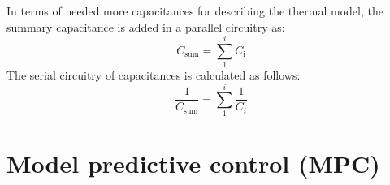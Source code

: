     In terms of needed more capacitances for describing the thermal model, the summary capacitance is added in a parallel circuitry as: 
    \begin{equation}
    \label{eq:capacityparallel}
        C_\text{sum} = \sum \limits_1^i C_\text{i} 
    \end{equation}
    The serial circuitry of capacitances is calculated as follows:
    \begin{equation}
    \label{eq:capacityseriell}
       \frac{1}{C_\text{sum}} = \sum \limits_1^i \frac{1}{C_i} 
    \end{equation}
    


\section{Model predictive control (MPC)}
\label{section:mpc}

